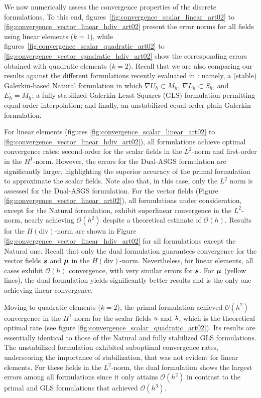 We now numerically assess the convergence properties of the discrete formulations. To this end, figures~\ref{fig:convergence_scalar_linear_art02} to \ref{fig:convergence_vector_linear_hdiv_art02} present the error norms for all fields using linear elements ($k=1$), while figures~\ref{fig:convergence_scalar_quadratic_art02} to \ref{fig:convergence_vector_quadratic_hdiv_art02} show the corresponding errors obtained with quadratic elements ($k=2$). Recall that we are also comparing our results against the different formulations recently evaluated in \cite{ddcm1_article_gus}: namely, a (stable) Galerkin-based Natural formulation in which $\nabla{U}_h \subset M_h$, $\nabla{L}_h \subset S_h$, and $E_h = M_h$; a fully stabilized Galerkin Least Squares (GLS) formulation permitting equal-order interpolation; and finally, an unstabilized equal-order plain Galerkin formulation.

For linear elements (figures \ref{fig:convergence_scalar_linear_art02} to \ref{fig:convergence_vector_linear_hdiv_art02}), all formulations achieve optimal convergence rates: second-order for the scalar fields in the $L^2$-norm and first-order in the $H^1$-norm. However, the errors for the Dual-ASGS formulation are significantly larger, highlighting the superior accuracy of the primal formulation to approximate the scalar fields.
Note also that, in this case, only the $L^2$ norm is assessed for the Dual-ASGS formulation. For the vector fields (Figure \ref{fig:convergence_vector_linear_art02}), all formulations under consideration, except for the Natural formulation, exhibit superlinear convergence in the $L^2$-norm, nearly achieving $\mathcal{O}(h^2)$ despite a theoretical estimate of $\mathcal{O}(h)$.
Results for the $H(\text{div})$-norm are shown in Figure \ref{fig:convergence_vector_linear_hdiv_art02} for all formulations except the Natural one. Recall that only the dual formulation guarantees convergence for the vector fields $\bm{s}$ and $\bm{\mu}$ in the $H(\text{div})$-norm. Nevertheless, for linear elements, all cases exhibit $\mathcal{O}(h)$ convergence, with very similar errors for $\bm{s}$. For $\bm{\mu}$ (yellow lines), the dual formulation yields significantly better results and is the only one achieving linear convergence.

Moving to quadratic elements ($k=2$), the primal formulation achieved $\mathcal{O}(h^2)$ convergence in the $H^1$-norm for the scalar fields $u$ and $\lambda$, which is the theoretical optimal rate (see figure \ref{fig:convergence_scalar_quadratic_art02}). Its results are essentially identical to those of the Natural and fully stabilized GLS formulations. The unstabilized formulation exhibited suboptimal convergence rates, underscoring the importance of stabilization, that was not evident for linear elements. For these fields in the $L^2$-norm, the dual formulation shows the largest errors among all formulations since it only attains $\mathcal{O}(h^2)$ in contrast to
the primal and GLS formulations that achieved $\mathcal{O}(h^3)$.

